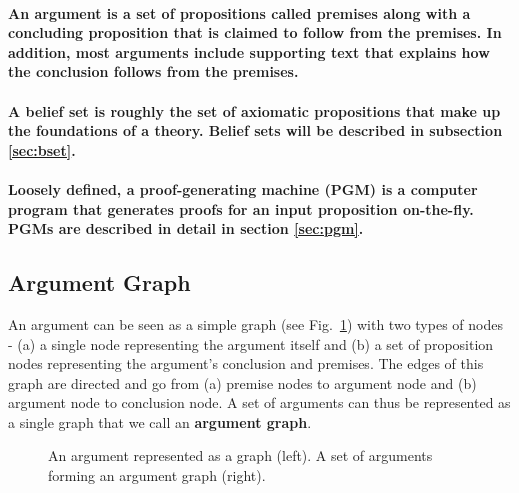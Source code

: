 \documentclass[runningheads]{llncs}
\begin{document}
\paragraph{An \textbf{argument} is a set of propositions called premises along with a concluding proposition that is claimed to follow from the premises. In addition, most arguments include supporting text that explains how the conclusion follows from the premises.}

\paragraph{A \textbf{belief set} is roughly the set of axiomatic propositions that make up the foundations of a theory. Belief sets will be described in subsection \ref{sec:bset}.}

\paragraph{Loosely defined, a \textbf{proof-generating machine} (PGM) is a computer program that generates proofs for an input proposition on-the-fly. PGMs are described in detail in section \ref{sec:pgm}.}

\subsection{Argument Graph}
An argument can be seen as a simple graph (see Fig.~\ref{argument_graph}) with two types of nodes - (a) a single node representing the argument itself and (b) a set of proposition nodes representing the argument's conclusion and premises. The edges of this graph are directed and go from (a) premise nodes to argument node and (b) argument node to conclusion node. A set of arguments can thus be represented as a single graph that we call an \textbf{argument graph}.

\begin{figure}[!ht]
\begin{center}
\caption{An argument represented as a graph (left). A set of arguments forming an argument graph (right).}
\label{argument_graph}
\end{center}
\end{figure}
\end{document}

